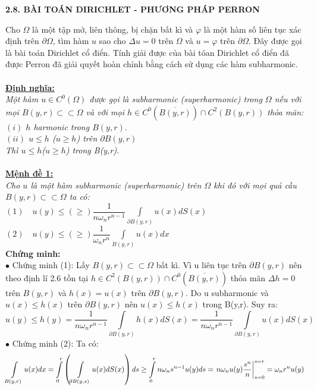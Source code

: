 \begin{center}
\textbf{2.8. BÀI TOÁN DIRICHLET - PHƯƠNG PHÁP PERRON}
\end{center}

Cho  $\Omega$ là một tập mở, liên thông, bị chặn bất kì và  $\varphi$ là một hàm số liên tục xác định trên 
$\partial \Omega$, tìm hàm $u$ sao cho $\Delta u = 0$ trên $\Omega$ và $u=\varphi$ trên $\partial\Omega$. Đây được gọi là bài toán Dirichlet cổ điển. Tính giải được của bài tóan Dirichlet cổ điển đã được Perron đã giải quyết hoàn chỉnh bằng cách sử dụng các hàm subharmonic.
\\
\\
\textbf{\underline{Định nghĩa:}}
\\
\textit{Một hàm $u\in C^0(\Omega) $ được gọi là subharmonic (superharmonic) trong  $\Omega $ nếu 
với mọi $B(y,r) \subset  \subset \Omega$ và với mọi $h \in C^0(\overline {B(y,r)}) \cap C^2({B(y,r)}) $ thỏa mãn:
\\
$(i)$ $h$ harmonic trong $B(y,r).$
\\
$(ii)$ $u \le h$ ($u \ge h$) trên $\partial B(y,r)$
\\
Thì $u\le h$($u\ge h$) trong B(y,r).}
\\
\\
\textbf{\underline{Mệnh đề 1:}}
\\
\textit{Cho $u$ là một hàm subharmonic (superharmonic) trên $\Omega$ khi đó với mọi quả cầu $B(y,r) \subset\subset \Omega$ ta có:
\\
$(1)\quad u(y) \le ( \ge )\dfrac{1}{{n\omega _n r^{n - 1} }}\int\limits_{\partial B(y,r)} {u(x)dS(x)} $
\\
$(2)\quad u(y) \le ( \ge )\dfrac{1}{{\omega _n r^n }}\int\limits_{B(y,r)} {u(x)dx} $}
\\
\textbf{Chứng minh:}
\\
{$\bullet$  {Chứng minh (1):} }
Lấy $B(y,r) \subset\subset \Omega$ bất kì. Vì u liên tục trên $\partial B(y,r)$ nên theo định lí 2.6 tồn tại $h  \in C^2 (B(y,r)) \cap C^0 (\overline {B(y,r)} )$ thỏa mãn $\Delta h = 0$ trên $B(y,r)$ và $h (x) = u(x)$ trên $\partial B(y,r)$.
Do u subharmonic và $u(x) \le h(x)$ trên $\partial B(y,r)$ nên $u(x)\le h(x)$ trong B(y,r). Suy ra:
\[
u(y) \le h(y) = \frac{1}{{n\omega _n r^{n - 1} }}\int\limits_{\partial B(y,r)} {h(x)dS(x) = } \frac{1}{{n\omega _n r^{n - 1} }}\int\limits_{\partial B(y,r)} {u(x)dS(x)} 
\]
{$\bullet$ {Chứng minh (2):} }
Ta có:
\[
 \int\limits_{B(y,r)} {u(x)dx = \int\limits_0^r {\left( {\int\limits_{\partial B(y,s)} {u(x)dS(x)} } \right)ds} }  
  \ge \int\limits_0^r {n\omega _n s^{n - 1} u(y)ds}  = \left. {n\omega _n u(y)\frac{{s^n }}{n}} \right|_{s = 0}^{s = r}  = \omega _n r^n u(y) \\ 
\]

